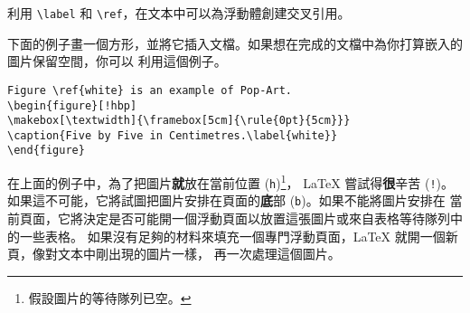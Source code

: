利用 \verb|\label| 和 \verb|\ref|，在文本中可以為浮動體創建交叉引用。

下面的例子畫一個方形，並將它插入文檔。如果想在完成的文檔中為你打算嵌入的圖片保留空間，你可以
利用這個例子。

\begin{code}
\begin{verbatim}
Figure \ref{white} is an example of Pop-Art.
\begin{figure}[!hbp]
\makebox[\textwidth]{\framebox[5cm]{\rule{0pt}{5cm}}}
\caption{Five by Five in Centimetres.\label{white}}
\end{figure}
\end{verbatim}
\end{code}

\noindent 在上面的例子中，為了把圖片{\textbf
就放在當前位置} (\texttt{h})\footnote{假設圖片的等待隊列已空。}，
\LaTeX{} 嘗試得{\textbf 很辛苦} (\texttt{!})。
如果這不可能，它將試圖把圖片安排在頁面的{\textbf
底部} (\texttt{b})。如果不能將圖片安排在
當前頁面，它將決定是否可能開一個浮動頁面以放置這張圖片或來自表格等待隊列中的一些表格。
如果沒有足夠的材料來填充一個專門浮動頁面，\LaTeX{} 就開一個新頁，像對文本中剛出現的圖片一樣，
再一次處理這個圖片。

